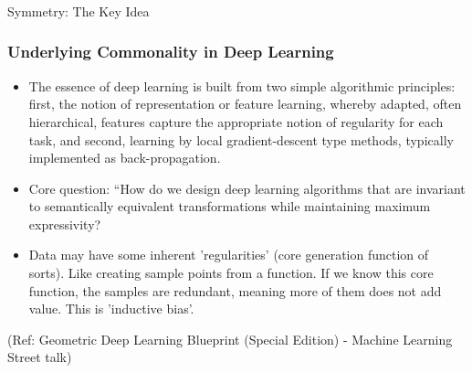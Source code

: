 \begin{frame}[fragile]\frametitle{}
\begin{center}
{\Large Symmetry: The Key Idea}
\end{center}
\end{frame}

\begin{frame}[fragile]\frametitle{Underlying Commonality in Deep Learning}


\begin{itemize}
\item The essence of deep learning is built from two simple algorithmic principles: first, the notion of representation or feature learning, whereby adapted, often hierarchical, features capture the appropriate notion of regularity for each task, and second, learning by local gradient-descent type methods, typically implemented as back-propagation.
\item Core question: ``How do we design deep learning algorithms that are invariant to semantically equivalent transformations while maintaining maximum expressivity?
\item Data may have some inherent 'regularities' (core generation function of sorts). Like creating sample points from a function. If we know this core function, the samples are redundant, meaning more of them does not add value. This is 'inductive bias'.
\end{itemize}
	  
{\tiny (Ref: Geometric Deep Learning Blueprint (Special Edition) - Machine Learning Street talk)}

\end{frame}

